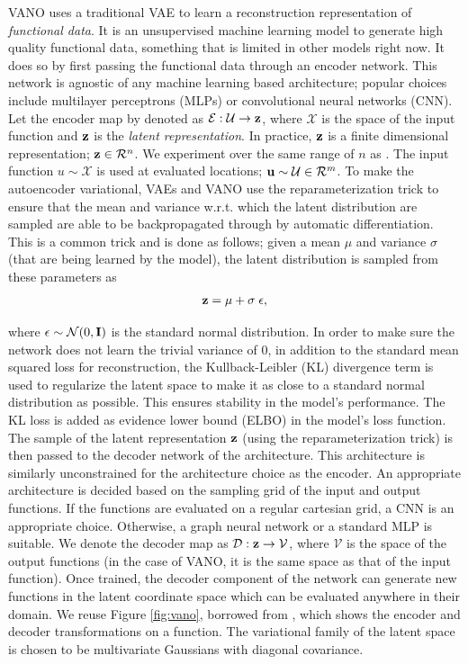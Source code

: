 \documentclass[11pt, fullpage,letterpaper]{article}
\begin{document}
VANO uses a traditional VAE to learn a reconstruction representation of \textit{functional data}. It is an unsupervised machine learning model to generate high quality functional data, something that is limited in other models right now. It does so by first passing the functional data through an encoder network. This network is agnostic of any machine learning based architecture; popular choices include multilayer perceptrons (MLPs) or convolutional neural networks (CNN). Let the encoder map by denoted as $\mathcal{E}: \mathcal{U} \rightarrow {\bf z}$, where $\mathcal{X}$ is the space of the input function and ${\bf z}$ is the \textit{latent representation}. In practice, ${\bf z}$ is a finite dimensional representation; ${\bf z} \in \mathcal{R}^n$. We experiment over the same range of $n$ as \cite{vano}. The input function $u \sim \mathcal{X}$ is used at evaluated locations; ${\bf u} \sim \mathcal{U} \in \mathcal{R}^m$. To make the autoencoder variational, VAEs and VANO use the reparameterization trick to ensure that the mean and variance w.r.t. which the latent distribution are sampled are able to be backpropagated through by automatic differentiation. This is a common trick and is done as follows; given a mean $\mu$ and variance $\sigma$ (that are being learned by the model), the latent distribution is sampled from these parameters as
\begin{align}
{\bf z} = \mu + \sigma \; \epsilon,
\end{align}

where $\epsilon \sim \mathcal{N}(0, {\bf I})$ is the standard normal distribution. In order to make sure the network does not learn the trivial variance of $0$, in addition to the standard mean squared loss for reconstruction, the Kullback-Leibler (KL) divergence term is used to regularize the latent space to make it as close to a standard normal distribution as possible. This ensures stability in the model's performance. The KL loss is added as evidence lower bound (ELBO) in the model's loss function. The sample of the latent representation ${\bf z}$ (using the reparameterization trick) is then passed to the decoder network of the architecture. This architecture is similarly unconstrained for the architecture choice as the encoder. An appropriate architecture is decided based on the sampling grid of the input and output functions. If the functions are evaluated on a regular cartesian grid, a CNN is an appropriate choice. Otherwise, a graph neural network or a standard MLP is suitable. We denote the decoder map as $\mathcal{D}: {\bf z} \rightarrow \mathcal{V}$, where $\mathcal{V}$ is the space of the output functions (in the case of VANO, it is the same space as that of the input function). Once trained, the decoder component of the network can generate new functions in the latent coordinate space which can be evaluated anywhere in their domain. We reuse Figure \ref{fig:vano}, borrowed from \cite{seidman2023variational}, which shows the encoder and decoder transformations on a function. The variational family of the latent space is chosen to be multivariate Gaussians with diagonal covariance.
\end{document}
